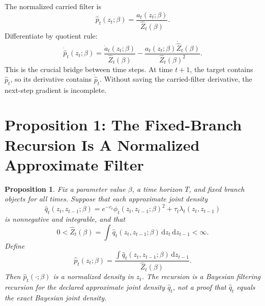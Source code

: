\documentclass[11pt]{article}
\newtheorem{proposition}{Proposition}
\theoremstyle{remark}
\newcommand{\dd}{\,\mathrm d}
\begin{document}
The normalized carried filter is
\[
    \widehat p_t(z_t;\beta)
    =
    \frac{a_t(z_t;\beta)}{\widehat Z_t(\beta)}.
    \tag{75}
\]
Differentiate by quotient rule:
\[
    \dot{\widehat p}_t(z_t;\beta)
    =
    \frac{\dot a_t(z_t;\beta)}{\widehat Z_t(\beta)}
    -
    \frac{a_t(z_t;\beta)\dot{\widehat Z}_t(\beta)}
    {\widehat Z_t(\beta)^2}.
    \tag{76}
\]
This is the crucial bridge between time steps.  At time \(t+1\), the target
contains \(\widehat p_t\), so its derivative contains
\(\dot{\widehat p}_t\).  Without saving the carried-filter derivative, the
next-step gradient is incomplete.

\section{Proposition 1: The Fixed-Branch Recursion Is A Normalized Approximate Filter}

\begin{proposition}
Fix a parameter value \(\beta\), a time horizon \(T\), and fixed branch objects
for all times.  Suppose that each approximate joint density
\[
    \widehat q_t(z_t,z_{t-1};\beta)
    =
    e^{-c_t}\phi_t(z_t,z_{t-1};\beta)^2
    +
    \tau_t\lambda_t(z_t,z_{t-1})
    \tag{77}
\]
is nonnegative and integrable, and that
\[
    0<\widehat Z_t(\beta)
    =
    \int \widehat q_t(z_t,z_{t-1};\beta)\dd z_t\dd z_{t-1}
    <\infty.
    \tag{78}
\]
Define
\[
    \widehat p_t(z_t;\beta)
    =
    \frac{\int \widehat q_t(z_t,z_{t-1};\beta)\dd z_{t-1}}
    {\widehat Z_t(\beta)}.
    \tag{79}
\]
Then \(\widehat p_t(\cdot;\beta)\) is a normalized density in \(z_t\).  The
recursion is a Bayesian filtering recursion for the declared approximate joint
density \(\widehat q_t\), not a proof that \(\widehat q_t\) equals the exact
Bayesian joint density.
\end{proposition}
\end{document}
